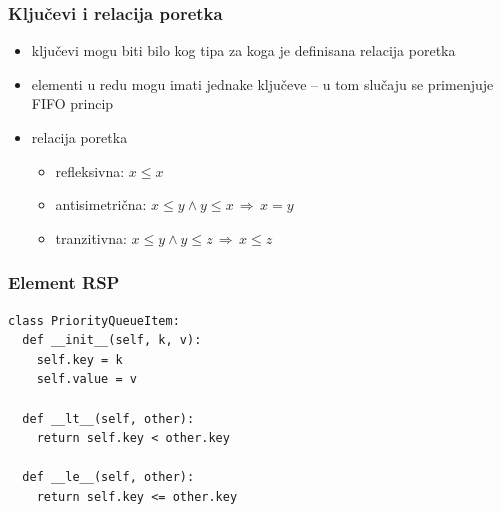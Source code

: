 \documentclass[compress,aspectratio=169]{beamer}
\begin{document}
\begin{frame}[fragile]
  \frametitle{Ključevi i relacija poretka}
  \begin{itemize}
    \item ključevi mogu biti bilo kog tipa za koga je definisana relacija poretka
    \item elementi u redu mogu imati jednake ključeve -- u tom slučaju se primenjuje FIFO princip
    \item relacija poretka
    \begin{itemize}
      \item refleksivna: $x\leq x$
      \item antisimetrična: $x\leq y \land y\leq x \, \Rightarrow \, x = y$
      \item tranzitivna: $x\leq y \land y\leq z \, \Rightarrow \, x\leq z$
    \end{itemize}
  \end{itemize}
\end{frame}

\begin{frame}
  \frametitle{Element RSP}
\begin{verbatim}
class PriorityQueueItem:
  def __init__(self, k, v):
    self.key = k
    self.value = v
    
  def __lt__(self, other):
    return self.key < other.key
    
  def __le__(self, other):
    return self.key <= other.key
\end{verbatim}
\end{frame}
\end{document}
